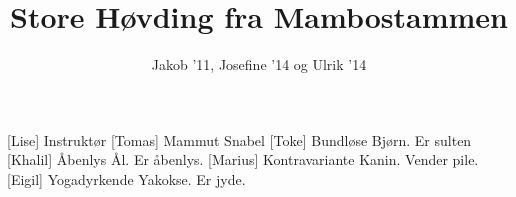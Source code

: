 \documentclass[a4paper,11pt]{article}
\title{Store Høvding fra Mambostammen}
\author{Jakob '11, Josefine '14 og Ulrik '14}
\begin{document}
\maketitle

\begin{roles}
[Lise] Instruktør
[Tomas] Mammut Snabel
[Toke] Bundløse Bjørn. Er sulten
[Khalil] Åbenlys Ål. Er åbenlys.
[Marius] Kontravariante Kanin. Vender pile.
[Eigil] Yogadyrkende Yakokse. Er jyde.
\end{roles}

\begin{props}
\end{props}
\end{document}

